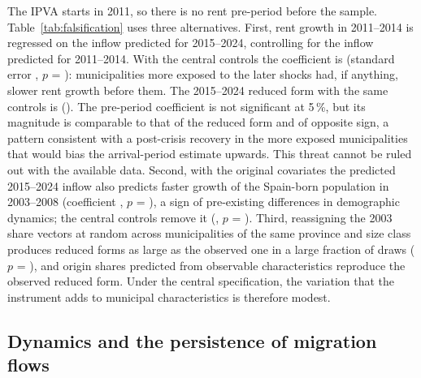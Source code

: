 \documentclass[11pt,a4paper]{article}
\begin{document}
The IPVA starts in 2011, so there is no rent pre-period before the sample. Table~\ref{tab:falsification} uses three alternatives. First, rent growth in 2011--2014 is regressed on the inflow predicted for 2015--2024, controlling for the inflow predicted for 2011--2014. With the central controls the coefficient is \preW{} (standard error \preWse, $p$ = \preWp): municipalities more exposed to the later shocks had, if anything, slower rent growth before them. The 2015--2024 reduced form with the same controls is \rfLDW{} (\rfLDWse). The pre-period coefficient is not significant at 5\,\%, but its magnitude is comparable to that of the reduced form and of opposite sign, a pattern consistent with a post-crisis recovery in the more exposed municipalities that would bias the arrival-period estimate upwards. This threat cannot be ruled out with the available data. Second, with the original covariates the predicted 2015--2024 inflow also predicts faster growth of the Spain-born population in 2003--2008 (coefficient \natPreOrig, $p$ = \natPreOrigP), a sign of pre-existing differences in demographic dynamics; the central controls remove it (\natPreCen, $p$ = \natPreCenP). Third, reassigning the 2003 share vectors at random across municipalities of the same province and size class produces reduced forms as large as the observed one in a large fraction of draws ($p$ = \permP), and origin shares predicted from observable characteristics reproduce the observed reduced form. Under the central specification, the variation that the instrument adds to municipal characteristics is therefore modest.



\subsection{Dynamics and the persistence of migration flows}
\end{document}
